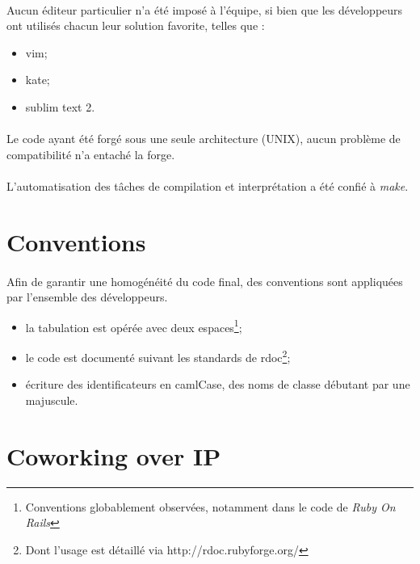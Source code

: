         \paragraph*{}
        Aucun éditeur particulier n'a été imposé à l'équipe, si bien que les  développeurs ont utilisés chacun leur solution favorite, telles que :
	\begin{itemize}
		\item vim;
		\item kate;
		\item sublim text 2.
	\end{itemize}
	\paragraph*{}
	Le code ayant été forgé sous une seule architecture (UNIX), aucun problème de compatibilité n'a entaché la forge.
	\paragraph*{}
	L'automatisation des tâches de compilation et interprétation a été confié à \textit{make}.
\newpage


\section{Conventions}
        \paragraph*{}
        Afin de garantir une homogénéité du code final, des conventions sont appliquées par l'ensemble des développeurs.
	\begin{itemize}
		\item  la tabulation est opérée avec deux espaces\footnote{Conventions globablement observées, notamment dans le code de \textit{Ruby On  Rails}};
		\item le code est documenté suivant les standards de rdoc\footnote{Dont l'usage est détaillé via http://rdoc.rubyforge.org/};
		\item écriture des identificateurs en camlCase, des noms de classe débutant par une majuscule.
	\end{itemize}


\section{Coworking over IP}
